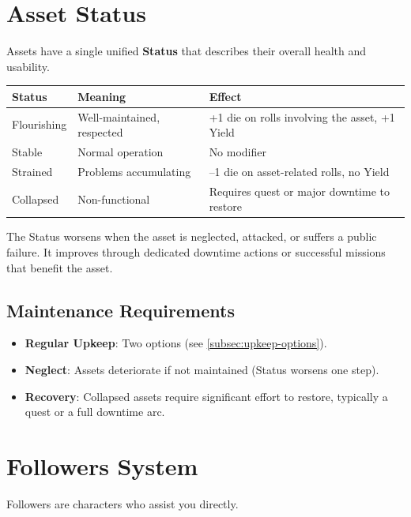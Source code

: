 \section{Asset Status}
\label{sec:asset-status}

Assets have a single unified \textbf{Status} that describes their overall health and usability.

\begin{center}
\small
\begin{tabular}{lll}
\toprule
\textbf{Status} & \textbf{Meaning} & \textbf{Effect} \\
\midrule
Flourishing & Well-maintained, respected & +1 die on rolls involving the asset, +1 Yield \\
Stable & Normal operation & No modifier \\
Strained & Problems accumulating & --1 die on asset-related rolls, no Yield \\
Collapsed & Non-functional & Requires quest or major downtime to restore \\
\bottomrule
\end{tabular}
\end{center}

The Status worsens when the asset is neglected, attacked, or suffers a public failure. It improves through dedicated downtime actions or successful missions that benefit the asset.

\subsection*{Maintenance Requirements}
\label{sec:asset-maintenance}
\begin{itemize}
\item \textbf{Regular Upkeep}: Two options (see \ref{subsec:upkeep-options}).
\item \textbf{Neglect}: Assets deteriorate if not maintained (Status worsens one step).
\item \textbf{Recovery}: Collapsed assets require significant effort to restore, typically a quest or a full downtime arc.
\end{itemize}

\section{Followers System}
\label{sec:followers-system}

Followers are characters who assist you directly.

